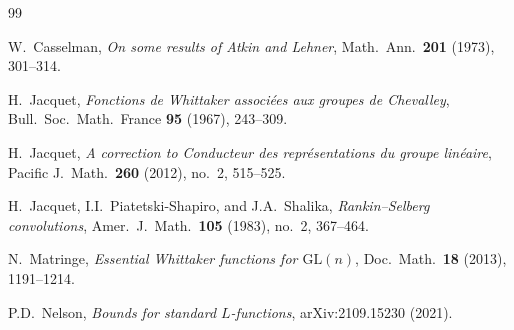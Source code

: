 \documentclass[12pt]{article}
\begin{document}
\begin{thebibliography}{99}

W.\ Casselman,
\textit{On some results of Atkin and Lehner},
Math.\ Ann.\ \textbf{201} (1973), 301--314.

H.\ Jacquet,
\textit{Fonctions de Whittaker associ\'{e}es aux groupes de Chevalley},
Bull.\ Soc.\ Math.\ France \textbf{95} (1967), 243--309.

H.\ Jacquet,
\textit{A correction to Conducteur des repr\'{e}sentations du groupe lin\'{e}aire},
Pacific J.\ Math.\ \textbf{260} (2012), no.\ 2, 515--525.

H.\ Jacquet, I.I.\ Piatetski-Shapiro, and J.A.\ Shalika,
\textit{Rankin--Selberg convolutions},
Amer.\ J.\ Math.\ \textbf{105} (1983), no.\ 2, 367--464.

N.\ Matringe,
\textit{Essential Whittaker functions for $\mathrm{GL}(n)$},
Doc.\ Math.\ \textbf{18} (2013), 1191--1214.

P.D.\ Nelson,
\textit{Bounds for standard $L$-functions},
arXiv:2109.15230 (2021).

\end{thebibliography}
\end{document}
